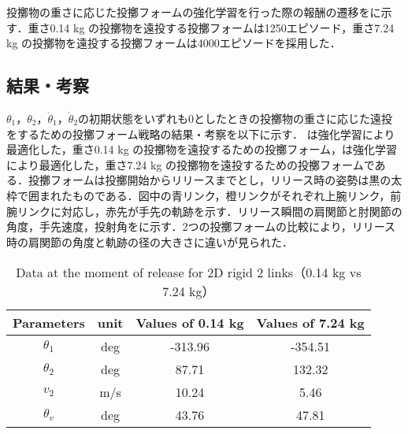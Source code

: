 投擲物の重さに応じた投擲フォームの強化学習を行った際の報酬の遷移をに示す．重さ0.14 kg の投擲物を遠投する投擲フォームは1250エピソード，重さ7.24 kg の投擲物を遠投する投擲フォームは4000エピソードを採用した．

\subsection{結果・考察}
$\theta_{1}$，$\theta_{2}$，$\dot{\theta}_{1}$，$\dot{\theta}_{2}$の初期状態をいずれも0としたときの投擲物の重さに応じた遠投をするための投擲フォーム戦略の結果・考察を以下に示す．
は強化学習により最適化した，重さ0.14 kg の投擲物を遠投するための投擲フォーム，は強化学習により最適化した，重さ7.24 kg の投擲物を遠投するための投擲フォームである．投擲フォームは投擲開始からリリースまでとし，リリース時の姿勢は黒の太枠で囲まれたものである．図中の青リンク，橙リンクがそれぞれ上腕リンク，前腕リンクに対応し，赤先が手先の軌跡を示す．リリース瞬間の肩関節と肘関節の角度，手先速度，投射角をに示す．2つの投擲フォームの比較により，リリース時の肩関節の角度と軌跡の径の大きさに違いが見られた．\\

\begin{table}[tb]
  \begin{center}
    \caption{Data at the moment of release for 2D rigid 2 links（0.14 kg vs 7.24 kg）}
    \begin{tabular}{c|c|c|c}
      \hline
      Parameters & unit & Values of 0.14 kg & Values of 7.24 kg \\
      \hline
      $\theta_{1}$ & deg & -313.96 & -354.51 \\
      $\theta_{2}$ & deg & 87.71 & 132.32 \\
      $v_{2}$ & m/s & 10.24 & 5.46 \\
      $\theta_{v}$ & deg & 43.76 & 47.81 \\
      \hline
    \end{tabular}
  \end{center}
\end{table}

